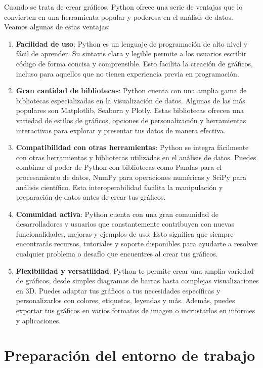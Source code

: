 \documentclass[
  a4paper,
]{article}
\begin{document}
Cuando se trata de crear gráficos, Python ofrece una serie de ventajas
que lo convierten en una herramienta popular y poderosa en el análisis
de datos. Veamos algunas de estas ventajas:

\begin{enumerate}
\def\labelenumi{\arabic{enumi}.}
\item
  \textbf{Facilidad de uso}: Python es un lenguaje de programación de
  alto nivel y fácil de aprender. Su sintaxis clara y legible permite a
  los usuarios escribir código de forma concisa y comprensible. Esto
  facilita la creación de gráficos, incluso para aquellos que no tienen
  experiencia previa en programación.
\item
  \textbf{Gran cantidad de bibliotecas}: Python cuenta con una amplia
  gama de bibliotecas especializadas en la visualización de datos.
  Algunas de las más populares son Matplotlib, Seaborn y Plotly. Estas
  bibliotecas ofrecen una variedad de estilos de gráficos, opciones de
  personalización y herramientas interactivas para explorar y presentar
  tus datos de manera efectiva.
\item
  \textbf{Compatibilidad con otras herramientas}: Python se integra
  fácilmente con otras herramientas y bibliotecas utilizadas en el
  análisis de datos. Puedes combinar el poder de Python con bibliotecas
  como Pandas para el procesamiento de datos, NumPy para operaciones
  numéricas y SciPy para análisis científico. Esta interoperabilidad
  facilita la manipulación y preparación de datos antes de crear tus
  gráficos.
\item
  \textbf{Comunidad activa}: Python cuenta con una gran comunidad de
  desarrolladores y usuarios que constantemente contribuyen con nuevas
  funcionalidades, mejoras y ejemplos de uso. Esto significa que siempre
  encontrarás recursos, tutoriales y soporte disponibles para ayudarte a
  resolver cualquier problema o desafío que encuentres al crear tus
  gráficos.
\item
  \textbf{Flexibilidad y versatilidad}: Python te permite crear una
  amplia variedad de gráficos, desde simples diagramas de barras hasta
  complejas visualizaciones en 3D. Puedes adaptar tus gráficos a tus
  necesidades específicas y personalizarlos con colores, etiquetas,
  leyendas y más. Además, puedes exportar tus gráficos en varios
  formatos de imagen o incrustarlos en informes y aplicaciones.
\end{enumerate}

\hypertarget{preparaciuxf3n-del-entorno-de-trabajo}{%
\section{Preparación del entorno de
trabajo}\label{preparaciuxf3n-del-entorno-de-trabajo}}
\end{document}
